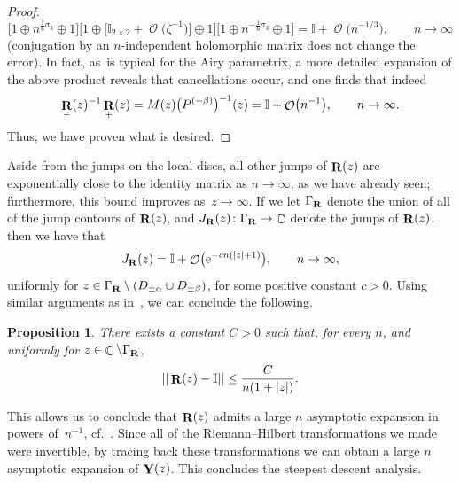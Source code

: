 \documentclass[pdftex]{sigma}
\DeclareMathOperator{\CC}{\mathbb{C}}
\DeclareMathOperator{\OO}{\mathcal{O}}
\DeclareMathOperator{\YY}{{\bf Y}}
\DeclareMathOperator{\boldR}{{\bf R}}
\numberwithin{equation}{section}
\newtheorem{Proposition}[Theorem]{Proposition}
 { \theoremstyle{definition}
\newtheorem{Definition}[Theorem]{Definition}
\newtheorem{Note}[Theorem]{Note}
\newtheorem{Example}[Theorem]{Example}
\newtheorem{Remark}[Theorem]{Remark} }
\begin{document}
\begin{proof}
 \begin{equation*}
 \bigl[1\oplus n^{\frac{1}{6}\sigma_3}\oplus 1\bigr] \bigl[1\oplus\bigl[\mathbb{I}_{2\times 2} + \OO\bigl(\zeta^{-1}\bigr)\bigr]\oplus 1\bigr]\bigl[1\oplus n^{-\frac{1}{6}\sigma_3}\oplus 1\bigr] = \mathbb{I} + \OO\bigl(n^{-1/3}\bigr), \qquad n\to \infty
 \end{equation*}
 (conjugation by an $n$-independent holomorphic matrix does not change the error). In fact, as~is typical for the Airy parametrix, a more detailed expansion of the above product reveals that cancellations occur, and one finds that indeed
 \begin{equation*}
 \boldR_-(z)^{-1}\boldR_+(z) = M(z) \bigl(P^{(-\beta)}\bigr)^{-1}(z) = \mathbb{I} + \OO\bigl(n^{-1}\bigr),\qquad n\to \infty.
 \end{equation*}
 Thus, we have proven what is desired.
\end{proof}

Aside from the jumps on the local discs, all other jumps of $\boldR(z)$ are exponentially close to the identity matrix as $n\to \infty$, as we have already seen; furthermore, this bound improves as~${z\to \infty}$. If we let $\Gamma_{\boldR}$ denote the union of all of the jump contours of $\boldR(z)$, and $J_{\boldR}(z)\colon \Gamma_{\boldR} \to \CC$ denote the jumps of $\boldR(z)$, then we have that
 \begin{equation*}
 J_{\boldR}(z) = \mathbb{I} + \OO\bigl({\rm e}^{-cn(|z|+1)}\bigr), \qquad n\to\infty,
 \end{equation*}
uniformly for $z\in \Gamma_{\boldR} \setminus \left(D_{\pm\alpha}\cup D_{\pm\beta}\right)$, for some positive constant $c>0$. Using similar arguments as in~\cite{DK1,DKM}, we can conclude the following.

\begin{Proposition}
 There exists a constant $C>0$ such that, for every $n$, and uniformly for ${z\in \CC\setminus \Gamma_{\boldR}}$,
 \begin{equation*}
 ||\boldR(z)-\mathbb{I}|| \leq \frac{C}{n(1+|z|)}.
 \end{equation*}
\end{Proposition}
This allows us to conclude that $\boldR(z)$ admits a large $n$ asymptotic expansion in powers of~$n^{-1}$, cf.~\cite[Theorem 7.10]{DKMVZ}. Since all of the Riemann--Hilbert transformations we made were invertible, by tracing back these transformations we can obtain a large $n$ asymptotic expansion of $\YY(z)$. This concludes the steepest descent analysis.
\end{document}
